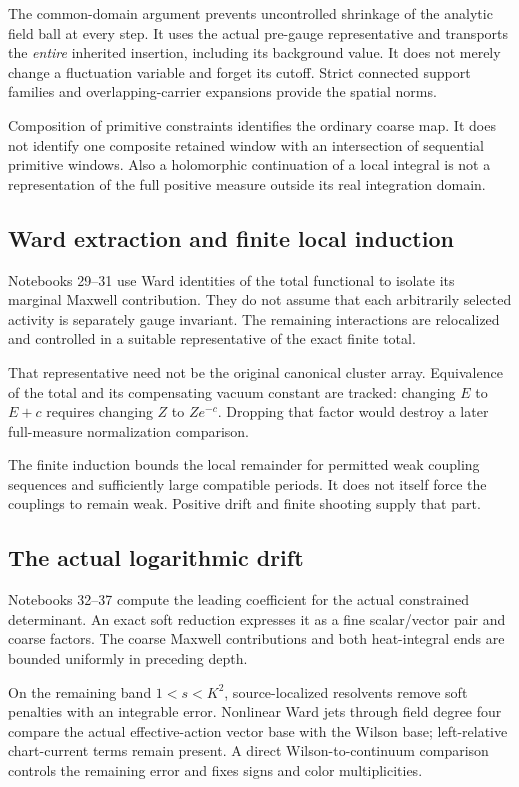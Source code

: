 The common-domain argument prevents uncontrolled shrinkage of
the analytic field ball at every step. It uses the actual
pre-gauge representative and transports the \emph{entire}
inherited insertion, including its background value.
It does not merely change a fluctuation variable and forget
its cutoff. Strict connected support families and
overlapping-carrier expansions provide the spatial norms.

Composition of primitive constraints identifies the ordinary
coarse map. It does not identify one composite retained window
with an intersection of sequential primitive windows. Also a
holomorphic continuation of a local integral is not a
representation of the full positive measure outside its
real integration domain.

\subsection{Ward extraction and finite local induction}

Notebooks 29--31 use Ward identities of the total functional
to isolate its marginal Maxwell contribution. They do not
assume that each arbitrarily selected activity is separately
gauge invariant. The remaining interactions are relocalized
and controlled in a suitable representative of the exact
finite total.

That representative need not be the original canonical cluster
array. Equivalence of the total and its compensating vacuum
constant are tracked: changing \(E\) to \(E+c\) requires
changing \(Z\) to \(Ze^{-c}\). Dropping that factor would
destroy a later full-measure normalization comparison.

The finite induction bounds the local remainder for permitted
weak coupling sequences and sufficiently large compatible
periods. It does not itself force the couplings to remain
weak. Positive drift and finite shooting supply that part.

\subsection{The actual logarithmic drift}

Notebooks 32--37 compute the leading coefficient for the
actual constrained determinant. An exact soft reduction
expresses it as a fine scalar/vector pair and coarse factors.
The coarse Maxwell contributions and both heat-integral ends
are bounded uniformly in preceding depth.

On the remaining band \(1<s<K^2\), source-localized resolvents
remove soft penalties with an integrable error. Nonlinear
Ward jets through field degree four compare the actual
effective-action vector base with the Wilson base;
left-relative chart-current terms remain present.
A direct Wilson-to-continuum comparison controls the
remaining error and fixes signs and color multiplicities.

